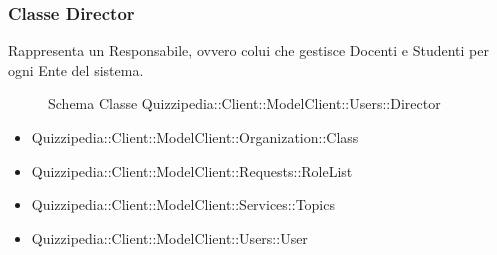 \subsubsection{Classe Director}
Rappresenta un Responsabile, ovvero colui che gestisce Docenti e Studenti per ogni Ente del sistema.
\begin{figure}[H]
\centering
\noindent{}
\caption{Schema Classe Quizzipedia::Client::ModelClient::Users::Director}
\end{figure}
\begin{itemize}
\item Quizzipedia::Client::ModelClient::Organization::Class
\item Quizzipedia::Client::ModelClient::Requests::RoleList
\item Quizzipedia::Client::ModelClient::Services::Topics
\item Quizzipedia::Client::ModelClient::Users::User
\end{itemize}
